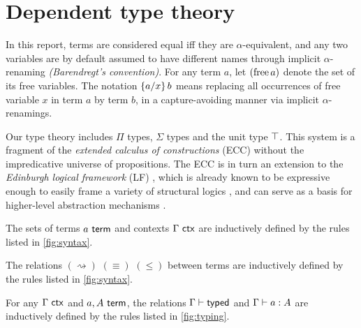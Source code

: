 \documentclass[twoside]{report}
\begin{document}
\section{Dependent type theory}
\label{sec:type_theory_standard}

In this report, terms are considered equal iff they are $\alpha$-equivalent, and any two variables are by default assumed to have different names through implicit $\alpha$-renaming \emph{(Barendregt's convention)}. For any term $a$, let $(\free a)$ denote the set of its free variables. The notation $\subst x a b$ means replacing all occurrences of free variable $x$ in term $a$ by term $b$, in a capture-avoiding manner via implicit $\alpha$-renamings.

Our type theory includes $\Pi$ types, $\Sigma$ types and the unit type $\unit$. This system is a fragment of the \emph{extended calculus of constructions} (ECC) \cite{luo1990extended,norell2007towards} without the impredicative universe of propositions. The ECC is in turn an extension to the \emph{Edinburgh logical framework} (LF) \cite{harper1993framework}, which is already known to be expressive enough to easily frame a variety of structural logics \cite{harper1993framework,pym1990proofs,cousineau2007embedding}, and can serve as a basis for higher-level abstraction mechanisms \cite{pollack2000dependently,sozeau2008first}.

\begin{definition}[Syntax]
    \label{def:syntax}
    The sets of terms $a \termo$ and contexts $\Gamma \ctxo$ are inductively defined by the rules listed in \cref{fig:syntax}.
\end{definition}

\begin{definition}
    \label{def:conversion}
    The relations $(\rightsquigarrow)$ $(\equiv)$ $(\leq)$ between terms are inductively defined by the rules listed in \cref{fig:syntax}.
\end{definition}

\begin{definition}
    \label{def:typing}
    For any $\Gamma \ctxo$ and $a, A \termo$, the relations $\Gamma \vdasho \ok$ and $\Gamma \vdasho a : A$ are inductively defined by the rules listed in \cref{fig:typing}.
\end{definition}
\end{document}
